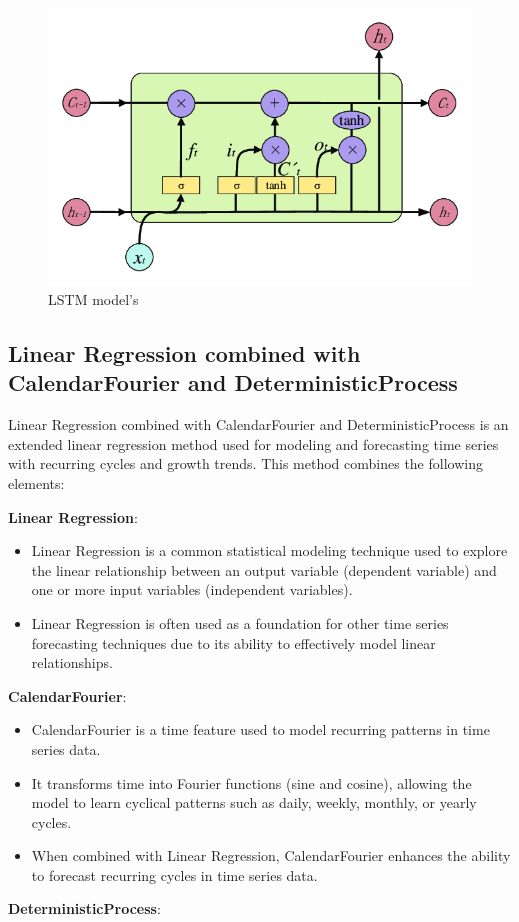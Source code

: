 \documentclass{ieeeojies}
\begin{document}
\begin{figure}[H]
  \centering
  \begin{minipage}{0.8\linewidth}
    \centering
    \includegraphics[width=\linewidth]{bibliography/Figure/LSTM_model.png}
    \caption{LSTM model's}
    \label{fig8}
  \end{minipage}
\end{figure}

\subsection{Linear Regression combined with CalendarFourier and DeterministicProcess }

Linear Regression combined with CalendarFourier and DeterministicProcess is an extended linear regression method used for modeling and forecasting time series with recurring cycles and growth trends. This method combines the following elements: 

\textbf{Linear Regression}:

\begin{itemize}
    \item Linear Regression is a common statistical modeling technique used to explore the linear relationship between an output variable (dependent variable) and one or more input variables (independent variables).
    \item Linear Regression is often used as a foundation for other time series forecasting techniques due to its ability to effectively model linear relationships.
\end{itemize}
\textbf{CalendarFourier}:

\begin{itemize}
    \item CalendarFourier is a time feature used to model recurring patterns in time series data.
    \item It transforms time into Fourier functions (sine and cosine), allowing the model to learn cyclical patterns such as daily, weekly, monthly, or yearly cycles.
    \item When combined with Linear Regression, CalendarFourier enhances the ability to forecast recurring cycles in time series data.
\end{itemize}
\textbf{DeterministicProcess}:
\end{document}
